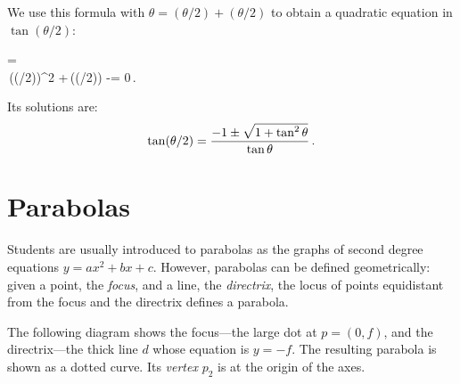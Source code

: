 We use this formula with $\theta=(\theta/2)+(\theta/2)$ to obtain a quadratic equation in $\tan(\theta/2)$:
\begin{form}{2.2}
\tan \theta=\\
\tan\theta \,(\tan(\theta/2))^2 \;+\,(\tan (\theta/2)) \;-\;\tan \theta = 0\,.
\end{form}
Its solutions are:
\[
\tan(\theta/2) = \displaystyle\frac{-1\pm\sqrt{1+\tan^2\theta}}{\tan\theta}\,.
\]

\chapter{Parabolas}\label{a.parabola}


Students are usually introduced to parabolas as the graphs of second degree equations $y=ax^2+bx+c$. However, parabolas can be defined geometrically: given a point, the \emph{focus}, and a line, the \emph{directrix}, the locus of points equidistant from the focus and the directrix defines a parabola.


The following diagram shows the focus---the large dot at $p=(0,f)$, and the directrix---the thick line $d$ whose equation is $y=-f$. The resulting parabola is shown as a dotted curve. Its \emph{vertex} $p_2$ is at the origin of the axes.

